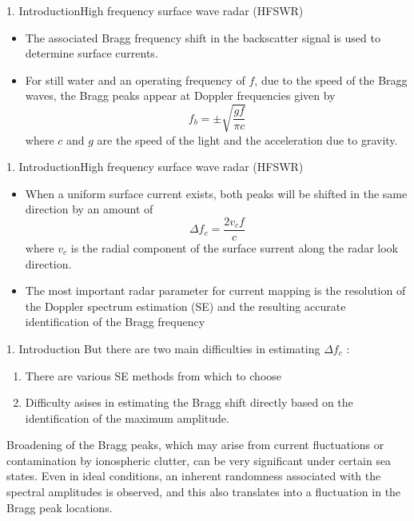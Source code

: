 \documentclass[12pt]{beamer}
\begin{document}
\begin{frame}{1. Introduction}{High frequency surface wave radar (HFSWR)}
  \begin{itemize}
    \item The associated Bragg frequency shift in the backscatter signal is used to determine surface currents. 
    \item For still water and an operating frequency of $f$, due to the speed of the Bragg waves, the Bragg peaks appear at Doppler frequencies given by\begin{equation}
      f_b=\pm \sqrt{\frac{gf}{\pi c}}
    \end{equation}
    where $c$ and $g$ are the speed of the light and the acceleration due to gravity.
  \end{itemize}
\end{frame}
\begin{frame}{1. Introduction}{High frequency surface wave radar (HFSWR)}
  \begin{itemize}
    \item When a uniform surface current exists, both peaks will be shifted in the same direction by an amount of \begin{equation}
      \Delta f_c=\frac{2v_c f}{c}
    \end{equation}
    where $v_c$ is the radial component of the surface surrent along the radar look direction.\pause
    \item The most important radar parameter for
    current mapping is {\color{magenta} the resolution of the Doppler spectrum estimation (SE)} and {\color{magenta} the resulting accurate     identification of the Bragg frequency}
  \end{itemize}
\end{frame}

\begin{frame}{1. Introduction}
  But there are two main difficulties in estimating $\Delta f_c$ :
  \begin{enumerate}
    \item There are various SE methods from which to choose
    \item Difficulty asises in estimating the Bragg shift directly based on the identification of the maximum amplitude.
  \end{enumerate}\pause
  Broadening of the Bragg peaks, which may arise from current fluctuations or contamination by ionospheric clutter, can be very significant under certain sea states. Even in ideal conditions, an inherent randomness associated with the spectral amplitudes is observed, and this also translates into a fluctuation in the Bragg peak locations.
\end{frame}
\end{document}
